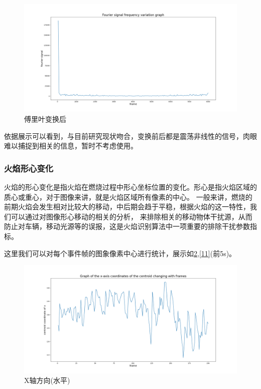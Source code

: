     \begin{figure}[ht]
        \centering
        \includegraphics[width=\textwidth]{figures/extract_flicker_02.png}
        \caption{傅里叶变换后}
        \label{9}
    \end{figure}
    

依据展示可以看到，与目前研究现状吻合，变换前后都是震荡非线性的信号，肉眼难以捕捉到相关的信息，暂时不考虑使用。

\subsubsection{火焰形心变化}
火焰的形心变化是指火焰在燃烧过程中形心坐标位置的变化。形心是指火焰区域的质心或重心，对于图像来讲，就是火焰区域所有像素的中心。
一般来讲，燃烧的前期火焰会发生相对比较大的移动，中后期会趋于平稳，根据火焰的这一特性，我们可以通过对图像形心移动的相关的分析，
来排除相关的移动物体干扰源，从而防止对车辆，移动光源等的误报，这是火焰识别算法中一项重要的排除干扰参数指标。

这里我们可以对每个事件帧的图象像素中心进行统计，展示如\ref{10},\ref{11}(前5s)。
\begin{figure}[ht]
    \centering
    \includegraphics[width=\textwidth]{figures/extract_centroid_x.png}
    \caption{X轴方向(水平)}
    \label{10}
    \end{figure}

